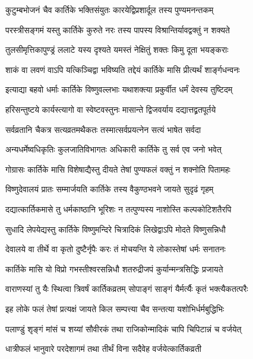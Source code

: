 \twolineshloka
{कुटुम्बभोजनं चैव कार्तिके भक्तिसंयुतः}
{कारयेद्विप्रशार्दूल तस्य पुण्यमनन्तकम्} %

\twolineshloka
{परस्त्रीसङ्गमं यस्तु कार्तिके कुरुते नरः}
{तस्य पापस्य विश्रान्तिर्यावद्वक्तुं न शक्यते} %

\twolineshloka
{तुलसीमृत्तिकापुण्ड्रं ललाटे यस्य दृश्यते}
{यमस्तं नेक्षितुं शक्तः किमु दूता भयङ्कराः} %

\twolineshloka
{शाकं वा लवणं वाऽपि यत्किञ्चिद्वा भविष्यति}
{तद्देयं कार्तिके मासि प्रीत्यर्थं शार्ङ्गधन्वनः} %

\twolineshloka
{इत्याद्या बहवो धर्माः कार्तिके विष्णुवल्लभाः}
{यथाशक्त्या प्रकुर्वीत धर्मं देवस्य तुष्टिदम्} %

\twolineshloka
{हरिसन्तुष्टये कार्यस्त्यागो वा स्वेष्टवस्तुनः}
{मासान्ते द्विजवर्याय दद्यात्तद्व्रतपूर्तये} %

\twolineshloka
{सर्वव्रतानि चैकत्र सत्यव्रतमथैकतः}
{तस्मात्सर्वप्रयत्नेन सत्यं भाषेत सर्वदा} %

\twolineshloka
{अन्यधर्मेष्वधिकृतिः कुलजातिविभागतः}
{अधिकारी कार्तिके तु सर्व एव जनो भवेत्} %

\twolineshloka
{गोग्रासः कार्तिके मासि विशेषाद्यैस्तु दीयते}
{तेषां पुण्यफलं वक्तुं न शक्नोति पितामहः} %

\twolineshloka
{विष्णुदेवालयं प्रातः सम्मार्जयति कार्तिके}
{तस्य वैकुण्ठभवने जायते सुदृढं गृहम्} %

\twolineshloka
{दद्यात्कार्तिकमासे तु धर्मकाष्ठानि भूरिशः}
{न तत्पुण्यस्य नाशोस्ति कल्पकोटिशतैरपि} %

\twolineshloka
{सुधादि लेपयेद्यस्तु कार्तिके विष्णुमन्दिरे}
{चित्रादिकं लिखेद्वाऽपि मोदते विष्णुसन्निधौ} %

\twolineshloka
{देवालये वा तीर्थे वा कृतो दुष्टैर्नृपैः करः}
{तं मोचयन्ति ये लोकास्तेषां धर्मः सनातनः} %

\twolineshloka
{कार्तिके मासि यो विप्रो गभस्तीश्वरसन्निधौ}
{शतरुद्रीजपं कुर्यान्मन्त्रसिद्धिः प्रजायते} %

\twolineshloka
{वाराणस्यां तु यैः स्थित्वा त्रिवर्षं कार्तिकव्रतम्}
{सोपाङ्गं साङ्गं यैर्मर्त्यैः कृतं भक्त्यैकतत्परैः} %

\twolineshloka
{इह लोके फलं तेषां प्रत्यक्षं जायते किल}
{सम्पत्त्या चैव सन्तत्या यशोभिर्धर्मबुद्धिभिः} %

\twolineshloka
{पलाण्डुं शृङ्गं मांसं च शय्यां सौवीरकं तथा}
{राजिकोन्मादिकं चापि चिपिटान्नं च वर्जयेत्} %

\twolineshloka
{धात्रीफलं भानुवारे परदेशागमं तथा}
{तीर्थं विना सदैवेह वर्जयेत्कार्तिकव्रती} %

